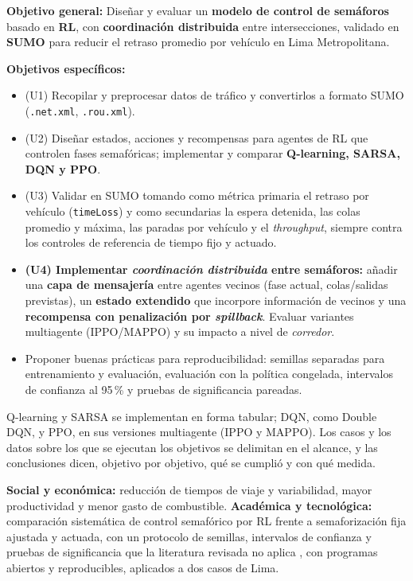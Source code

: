 
\textbf{Objetivo general:} Diseñar y evaluar un \textbf{modelo de control de semáforos} basado en \textbf{RL}, con \textbf{coordinación distribuida} entre intersecciones, validado en \textbf{SUMO} para reducir el retraso promedio por vehículo en Lima Metropolitana.

\textbf{Objetivos específicos:}
\begin{itemize}
    \item (U1) Recopilar y preprocesar datos de tráfico y convertirlos a formato SUMO (\texttt{.net.xml}, \texttt{.rou.xml}).
    \item (U2) Diseñar estados, acciones y recompensas para agentes de RL que controlen fases semafóricas; implementar y comparar \textbf{Q-learning, SARSA, DQN y PPO}.
    \item (U3) Validar en SUMO tomando como métrica primaria el retraso por vehículo (\texttt{timeLoss}) y como secundarias la espera detenida, las colas promedio y máxima, las paradas por vehículo y el \textit{throughput}, siempre contra los controles de referencia de tiempo fijo y actuado.
    \item \textbf{(U4) Implementar \textit{coordinación distribuida} entre semáforos:} añadir una \textbf{capa de mensajería} entre agentes vecinos (fase actual, colas/salidas previstas), un \textbf{estado extendido} que incorpore información de vecinos y una \textbf{recompensa con penalización por \textit{spillback}}. Evaluar variantes multiagente (IPPO/MAPPO) y su impacto a nivel de \textit{corredor}.
    \item Proponer buenas prácticas para reproducibilidad: semillas separadas para entrenamiento y evaluación, evaluación con la política congelada, intervalos de confianza al 95\,\% y pruebas de significancia pareadas.
\end{itemize}

\noindent Q-learning y SARSA se implementan en forma tabular; DQN, como Double DQN, y PPO, en sus versiones multiagente (IPPO y MAPPO). Los casos y los datos sobre los que se ejecutan los objetivos se delimitan en el alcance, y las conclusiones dicen, objetivo por objetivo, qué se cumplió y con qué medida.


\textbf{Social y económica:} reducción de tiempos de viaje y variabilidad, mayor productividad y menor gasto de combustible. \textbf{Académica y tecnológica:} comparación sistemática de control semafórico por RL frente a semaforización fija ajustada y actuada, con un protocolo de semillas, intervalos de confianza y pruebas de significancia que la literatura revisada no aplica \citep{Chavez2023,Chakrabarti2022}, con programas abiertos y reproducibles, aplicados a dos casos de Lima.

